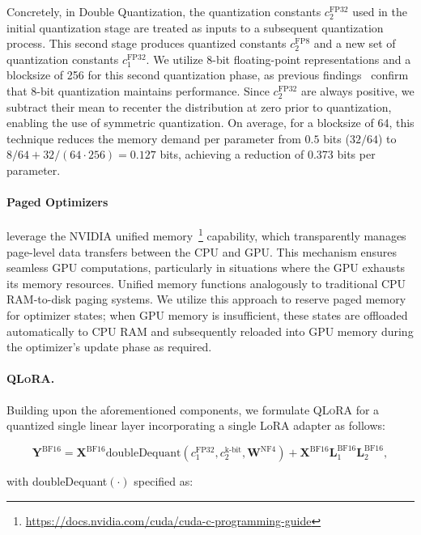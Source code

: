 Concretely, in Double Quantization, the quantization constants $c_2^{\text{FP32}}$ used in the initial quantization stage are treated as inputs to a subsequent quantization process. This second stage produces quantized constants $c_2^{\text{FP8}}$ and a new set of quantization constants $c_1^{\text{FP32}}$. We utilize 8-bit floating-point representations and a blocksize of 256 for this second quantization phase, as previous findings~\citep{dettmers2022case} confirm that 8-bit quantization maintains performance. Since $c_2^{\text{FP32}}$ are always positive, we subtract their mean to recenter the distribution at zero prior to quantization, enabling the use of symmetric quantization. On average, for a blocksize of 64, this technique reduces the memory demand per parameter from $0.5$ bits ($32/64$) to $8/64 + 32/(64\cdot256) = 0.127$ bits, achieving a reduction of 0.373 bits per parameter.

\paragraph{Paged Optimizers} leverage the NVIDIA unified memory~\footnote{\tiny \url{https://docs.nvidia.com/cuda/cuda-c-programming-guide}} capability, which transparently manages page-level data transfers between the CPU and GPU. This mechanism ensures seamless GPU computations, particularly in situations where the GPU exhausts its memory resources. Unified memory functions analogously to traditional CPU RAM-to-disk paging systems. We utilize this approach to reserve paged memory for optimizer states; when GPU memory is insufficient, these states are offloaded automatically to CPU RAM and subsequently reloaded into GPU memory during the optimizer's update phase as required.

\paragraph{\textsc{QLoRA}.} Building upon the aforementioned components, we formulate \textsc{QLoRA} for a quantized single linear layer incorporating a single LoRA adapter as follows:

\begin{equation}
    \mathbf{Y}^{\text{BF16}} =  \mathbf{X}^{\text{BF16}} \text{doubleDequant}(c_1^{\text{FP32}}, c_2^{\text{k-bit}}, \mathbf{W}^{\text{NF4}}) + \mathbf{X}^{\text{BF16}}\mathbf{L}^{\text{BF16}}_1\mathbf{L}^{\text{BF16}}_2,
\end{equation}

with doubleDequant$(\cdot)$ specified as:

